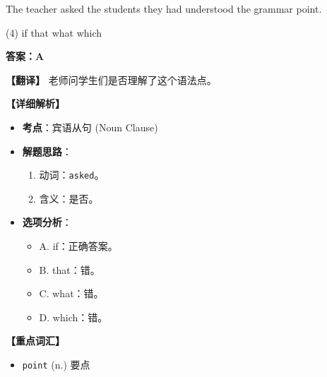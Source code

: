 \documentclass[11pt, a4paper]{article}
\newcommand{\analysis}[4]{
    \begin{solutionbox}
        \textbf{答案：#1}
        
        \textbf{【翻译】} #2
        
        \textbf{【详细解析】}
        #3
        
        \textbf{【重点词汇】}
        #4
    \end{solutionbox}
}
\newcommand{\blank}{\underline{\hspace{1.5cm}}}
\begin{document}
\begin{questions}
    \item The teacher asked the students \blank they had understood the grammar point.
    \begin{tasks}(4)
        \task if \task that \task what \task which
    \end{tasks}
    \analysis{A}{老师问学生们是否理解了这个语法点。}{
        \begin{itemize}
            \item \textbf{考点}：宾语从句 (Noun Clause)
            \item \textbf{解题思路}：
                \begin{enumerate}
                    \item 动词：\texttt{asked}。
                    \item 含义：是否。
                \end{enumerate}
            \item \textbf{选项分析}：
                \begin{itemize}
                    \item A. if：正确答案。
                    \item B. that：错。
                    \item C. what：错。
                    \item D. which：错。
                \end{itemize}
        \end{itemize}
    }{
        \begin{itemize}
            \item \texttt{point} (n.) 要点
        \end{itemize}
    }


\end{questions}
\end{document}
